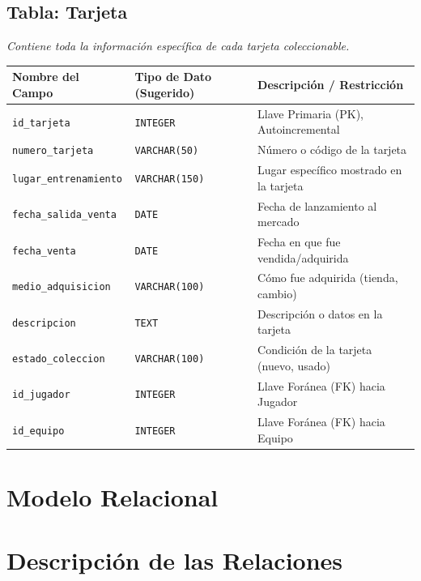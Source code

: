 \documentclass{article}
\begin{document}
\subsection*{Tabla: Tarjeta}
\textit{Contiene toda la información específica de cada tarjeta coleccionable.}
\begin{center}
\begin{tabular}{|l|l|p{6cm}|}
\hline
\textbf{Nombre del Campo} & \textbf{Tipo de Dato (Sugerido)} & \textbf{Descripción / Restricción} \\
\hline
\texttt{id\_tarjeta} & \texttt{INTEGER} & Llave Primaria (PK), Autoincremental \\
\texttt{numero\_tarjeta} & \texttt{VARCHAR(50)} & Número o código de la tarjeta \\
\texttt{lugar\_entrenamiento} & \texttt{VARCHAR(150)} & Lugar específico mostrado en la tarjeta \\
\texttt{fecha\_salida\_venta} & \texttt{DATE} & Fecha de lanzamiento al mercado \\
\texttt{fecha\_venta} & \texttt{DATE} & Fecha en que fue vendida/adquirida \\
\texttt{medio\_adquisicion} & \texttt{VARCHAR(100)} & Cómo fue adquirida (tienda, cambio) \\
\texttt{descripcion} & \texttt{TEXT} & Descripción o datos en la tarjeta \\
\texttt{estado\_coleccion} & \texttt{VARCHAR(100)} & Condición de la tarjeta (nuevo, usado) \\
\texttt{id\_jugador} & \texttt{INTEGER} & Llave Foránea (FK) hacia Jugador \\
\texttt{id\_equipo} & \texttt{INTEGER} & Llave Foránea (FK) hacia Equipo \\
\hline
\end{tabular}
\end{center}


\vspace{5mm}

\section{Modelo Relacional}

\section{Descripción de las Relaciones}
\end{document}
